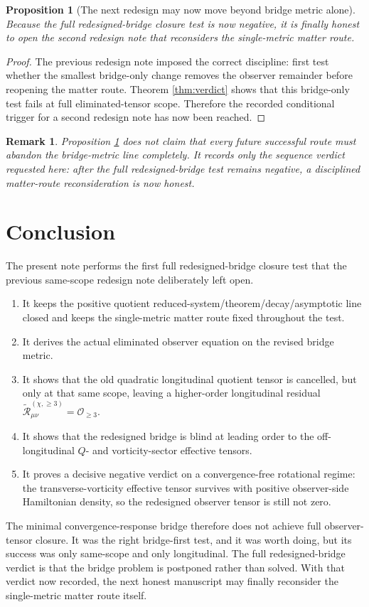 \documentclass[11pt]{article}
\newcommand{\ReLong}{\widetilde{\mathcal R}_{\mu\nu}^{(\chi,\ge 3)}}
\newtheorem{proposition}{Proposition}
\newtheorem{remark}{Remark}
\begin{document}
\begin{proposition}[The next redesign may now move beyond bridge metric alone]
\label{prop:next}
Because the full redesigned-bridge closure test is now negative, it is finally honest to open the second redesign note that reconsiders the single-metric matter route.
\end{proposition}

\begin{proof}
The previous redesign note imposed the correct discipline: first test whether the smallest bridge-only change removes the observer remainder before reopening the matter route. Theorem \ref{thm:verdict} shows that this bridge-only test fails at full eliminated-tensor scope. Therefore the recorded conditional trigger for a second redesign note has now been reached.
\end{proof}

\begin{remark}
Proposition \ref{prop:next} does not claim that every future successful route must abandon the bridge-metric line completely. It records only the sequence verdict requested here: after the full redesigned-bridge test remains negative, a disciplined matter-route reconsideration is now honest.
\end{remark}

\section{Conclusion}

The present note performs the first full redesigned-bridge closure test that the previous same-scope redesign note deliberately left open.
\begin{enumerate}
    \item It keeps the positive quotient reduced-system/theorem/decay/asymptotic line closed and keeps the single-metric matter route fixed throughout the test.
    \item It derives the actual eliminated observer equation on the revised bridge metric.
    \item It shows that the old quadratic longitudinal quotient tensor is cancelled, but only at that same scope, leaving a higher-order longitudinal residual \(\ReLong=\mathcal O_{\ge 3}\).
    \item It shows that the redesigned bridge is blind at leading order to the off-longitudinal \(Q\)- and vorticity-sector effective tensors.
    \item It proves a decisive negative verdict on a convergence-free rotational regime: the transverse-vorticity effective tensor survives with positive observer-side Hamiltonian density, so the redesigned observer tensor is still not zero.
\end{enumerate}

The minimal convergence-response bridge therefore does not achieve full observer-tensor closure. It was the right bridge-first test, and it was worth doing, but its success was only same-scope and only longitudinal. The full redesigned-bridge verdict is that the bridge problem is postponed rather than solved. With that verdict now recorded, the next honest manuscript may finally reconsider the single-metric matter route itself.
\end{document}
